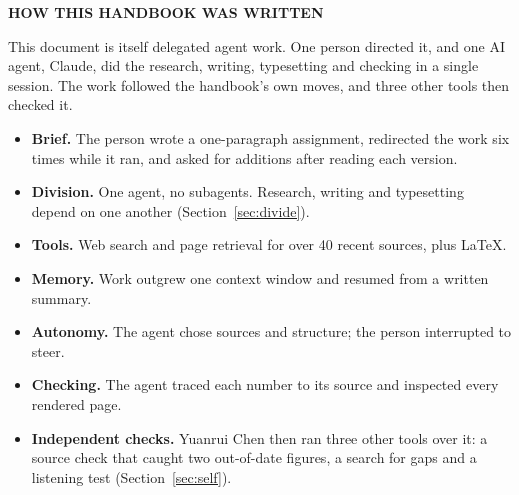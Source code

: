 \documentclass[11pt,letterpaper]{article}
\newcommand{\boxlabel}[1]{{\sffamily\footnotesize\bfseries\color{ink2} #1}}
\begin{document}
\vspace{0.5em}
\boxlabel{HOW THIS HANDBOOK WAS WRITTEN}\par
\vspace{0.1em}
{\small
This document is itself delegated agent work. One person directed it, and one AI agent,
Claude, did the research, writing, typesetting and checking in a single session. The work
followed the handbook's own moves, and three other tools then checked it.\par
\vspace{0.3em}
\noindent\begin{minipage}[t]{0.485\textwidth}\raggedright
\begin{itemize}[leftmargin=1.1em, itemsep=0.2em, topsep=0pt]
  \item \textbf{Brief.} The person wrote a one-paragraph assignment, redirected the work six
        times while it ran, and asked for additions after reading each version.
  \item \textbf{Division.} One agent, no subagents. Research, writing and typesetting depend
        on one another (Section~\ref{sec:divide}).
  \item \textbf{Tools.} Web search and page retrieval for over 40 recent sources, plus LaTeX.
\end{itemize}
\end{minipage}\hfill
\begin{minipage}[t]{0.485\textwidth}\raggedright
\begin{itemize}[leftmargin=1.1em, itemsep=0.2em, topsep=0pt]
  \item \textbf{Memory.} Work outgrew one context window and resumed from a written summary.
  \item \textbf{Autonomy.} The agent chose sources and structure; the person interrupted to
        steer.
  \item \textbf{Checking.} The agent traced each number to its source and inspected every
        rendered page.
  \item \textbf{Independent checks.} Yuanrui Chen then ran three other tools over it: a
        source check that caught two out-of-date figures, a search for gaps and a listening
        test (Section~\ref{sec:self}).
\end{itemize}
\end{minipage}\par}
\end{document}
